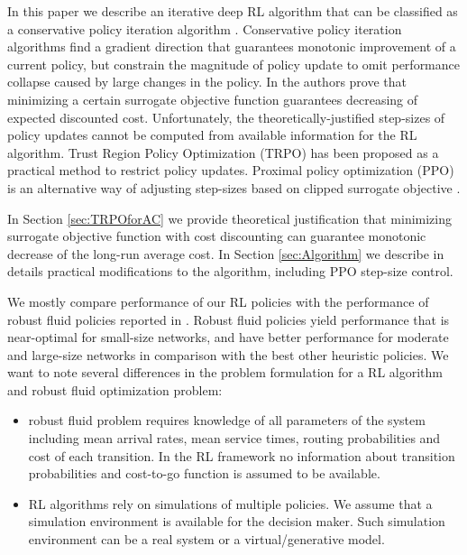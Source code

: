 \documentclass[11pt]{article}
\theoremstyle{definition}
\numberwithin{equation}{section}
\begin{document}
In this paper we describe an iterative deep RL algorithm that can be classified as a  conservative policy iteration algorithm \cite{Kakade2002}. Conservative policy iteration algorithms find a gradient direction that  guarantees monotonic improvement of a current policy, but constrain the magnitude of policy update to omit performance collapse caused by large changes in the policy.
In  \cite{Schulman2015} the authors prove that minimizing a certain surrogate objective function guarantees decreasing of expected discounted cost. Unfortunately, the theoretically-justified step-sizes of policy updates cannot be computed from available information for the RL algorithm.  Trust Region Policy Optimization (TRPO) \cite{Schulman2015} has been proposed as a practical method to restrict policy updates. Proximal policy optimization (PPO) is an alternative way of adjusting step-sizes based on clipped surrogate objective \cite{Schulman2017}. %

 In Section \ref{sec:TRPOforAC} we provide theoretical justification that minimizing  surrogate objective function with cost discounting can guarantee monotonic decrease of the long-run average cost. In Section \ref{sec:Algorithm} we describe in details practical modifications to the algorithm, including PPO step-size control.


We mostly compare performance of our RL policies with the performance of robust fluid policies reported in \cite{Bertsimas2015}.  Robust fluid policies yield performance that is near-optimal for small-size networks, and have better performance for moderate and large-size networks in comparison with  the best other heuristic policies. We want to note several differences in the problem formulation for a RL algorithm and robust fluid optimization problem:
\begin{itemize}
\item robust fluid problem requires knowledge of all parameters of the system including mean arrival rates,  mean service times, routing probabilities and cost of each transition. In the RL framework no information about transition probabilities and cost-to-go function  is assumed to be available.
\item RL algorithms rely on simulations of multiple policies. We assume that a simulation environment is available for the decision maker. Such simulation environment can be a real system or a virtual/generative model.
\end{itemize}
\end{document}

